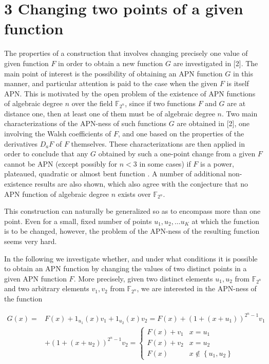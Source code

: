 \documentclass[10pt]{article}
\begin{document}
\section*{3 Changing two points of a given function}
The properties of a construction that involves changing precisely one value of given function $F$ in order to obtain a new function $G$ are investigated in [2]. The main point of interest is the possibility of obtaining an APN function $G$ in this manner, and particular attention is paid to the case when the given $F$ is itself APN. This is motivated by the open problem of the existence of APN functions of algebraic degree $n$ over the field $\mathbb{F}_{2^{n}}$, since if two functions $F$ and $G$ are at distance one, then at least one of them must be of algebraic degree $n$. Two main characterizations of the APN-ness of such functions $G$ are obtained in [2], one involving the Walsh coefficients of $F$, and one based on the properties of the derivatives $D_{a} F$ of $F$ themselves. These characterizations are then applied in order to conclude that any $G$ obtained by such a one-point change from a given $F$ cannot be APN (except possibly for $n<3$ in some cases) if $F$ is a power, plateaued, quadratic or almost bent function . A number of additional non-existence results are also shown, which also agree with the conjecture that no APN function of algebraic degree $n$ exists over $\mathbb{F}_{2^{n}}$.

This construction can naturally be generalized so as to encompass more than one point. Even for a small, fixed number of points $u_{1}, u_{2}, \ldots u_{K}$ at which the function is to be changed, however, the problem of the APN-ness of the resulting function seems very hard.

In the following we investigate whether, and under what conditions it is possible to obtain an APN function by changing the values of two distinct points in a given APN function $F$. More precisely, given two distinct elements $u_{1}, u_{2}$ from $\mathbb{F}_{2^{n}}$ and two arbitrary elements $v_{1}, v_{2}$ from $\mathbb{F}_{2^{n}}$, we are interested in the APN-ness of the function


\begin{align*}
G(x)= & F(x)+1_{u_{1}}(x) v_{1}+1_{u_{2}}(x) v_{2}=F(x)+\left(1+\left(x+u_{1}\right)\right)^{2^{n}-1} v_{1} \\
& +\left(1+\left(x+u_{2}\right)\right)^{2^{n}-1} v_{2}= \begin{cases}F(x)+v_{1} & x=u_{1} \\
F(x)+v_{2} & x=u_{2} \\
F(x) & x \notin\left\{u_{1}, u_{2}\right\}\end{cases} \tag{4}
\end{align*}
\end{document}
